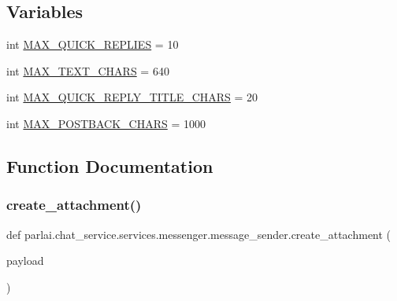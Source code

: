 \subsection*{Variables}
\begin{DoxyCompactItemize}
\item 
int \hyperlink{namespaceparlai_1_1chat__service_1_1services_1_1messenger_1_1message__sender_a61aecd6d7c4a42d5dc176d4227917a6b}{M\+A\+X\+\_\+\+Q\+U\+I\+C\+K\+\_\+\+R\+E\+P\+L\+I\+ES} = 10
\item 
int \hyperlink{namespaceparlai_1_1chat__service_1_1services_1_1messenger_1_1message__sender_ac76d8d8322c067651314d965d8a8a497}{M\+A\+X\+\_\+\+T\+E\+X\+T\+\_\+\+C\+H\+A\+RS} = 640
\item 
int \hyperlink{namespaceparlai_1_1chat__service_1_1services_1_1messenger_1_1message__sender_abd5af28e90499a925bd858f8c5316f7f}{M\+A\+X\+\_\+\+Q\+U\+I\+C\+K\+\_\+\+R\+E\+P\+L\+Y\+\_\+\+T\+I\+T\+L\+E\+\_\+\+C\+H\+A\+RS} = 20
\item 
int \hyperlink{namespaceparlai_1_1chat__service_1_1services_1_1messenger_1_1message__sender_a3bd30ae04ad334a26da3be760f18c2b4}{M\+A\+X\+\_\+\+P\+O\+S\+T\+B\+A\+C\+K\+\_\+\+C\+H\+A\+RS} = 1000
\end{DoxyCompactItemize}


\subsection{Function Documentation}
\mbox{\label{namespaceparlai_1_1chat__service_1_1services_1_1messenger_1_1message__sender_a8303c44a600b84c0d42770128be13e9a}} 
\subsubsection{\texorpdfstring{create\+\_\+attachment()}{create\_attachment()}}
{\footnotesize\ttfamily def parlai.\+chat\+\_\+service.\+services.\+messenger.\+message\+\_\+sender.\+create\+\_\+attachment (\begin{DoxyParamCaption}\item[{}]{payload }\end{DoxyParamCaption})}

